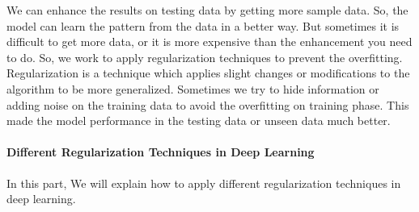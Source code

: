       We can enhance the results on testing data by getting more sample data. So, the model can learn the pattern from the data in a better way. But sometimes it is difficult to get more data, or it is more expensive than the enhancement you need to do. So, we work to apply regularization techniques to prevent the overfitting.
Regularization is a technique which applies slight changes or modifications to the algorithm to be more generalized. Sometimes we try to hide information or adding noise on the training data to avoid the overfitting on training phase. This made the model performance in the testing data or unseen data much better.
\paragraph{Different Regularization Techniques in Deep Learning}
In this part, We will explain how to apply different regularization techniques in deep learning.

